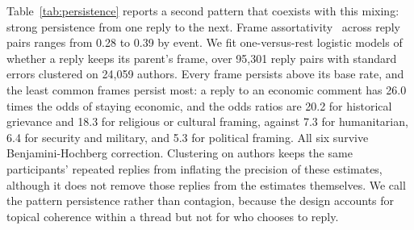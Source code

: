 Table~\ref{tab:persistence} reports a second pattern that coexists with this mixing: strong persistence from one reply to the next. Frame assortativity~\cite{newman2003mixing} across reply pairs ranges from 0.28 to 0.39 by event. We fit one-versus-rest logistic models of whether a reply keeps its parent's frame, over 95,301 reply pairs with standard errors clustered on 24,059 authors. Every frame persists above its base rate, and the least common frames persist most: a reply to an economic comment has 26.0 times the odds of staying economic, and the odds ratios are 20.2 for historical grievance and 18.3 for religious or cultural framing, against 7.3 for humanitarian, 6.4 for security and military, and 5.3 for political framing. All six survive Benjamini-Hochberg correction. Clustering on authors keeps the same participants' repeated replies from inflating the precision of these estimates, although it does not remove those replies from the estimates themselves. We call the pattern persistence rather than contagion, because the design accounts for topical coherence within a thread but not for who chooses to reply.



